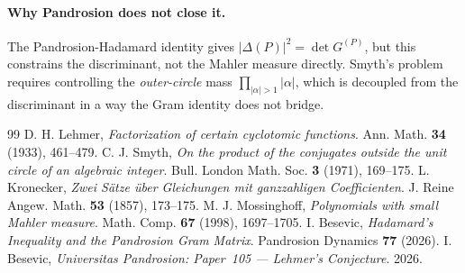 \documentclass[11pt,a4paper]{article}
\begin{document}
\paragraph{Why Pandrosion does not close it.}
The Pandrosion-Hadamard identity gives $|\Delta(P)|^2 = \det G^{(P)}$, but
this constrains the discriminant, not the Mahler measure directly. Smyth's
problem requires controlling the \emph{outer-circle} mass $\prod_{|\alpha|>1} |\alpha|$,
which is decoupled from the discriminant in a way the Gram identity does
not bridge.

\begin{thebibliography}{99}
 D. H. Lehmer, \textit{Factorization of certain cyclotomic
functions}. Ann. Math. \textbf{34} (1933), 461--479.
 C. J. Smyth, \textit{On the product of the conjugates
outside the unit circle of an algebraic integer}. Bull. London Math. Soc.
\textbf{3} (1971), 169--175.
 L. Kronecker, \textit{Zwei S\"atze \"uber Gleichungen
mit ganzzahligen Coefficienten}. J. Reine Angew. Math. \textbf{53}
(1857), 173--175.
 M. J. Mossinghoff, \textit{Polynomials with small
Mahler measure}. Math. Comp. \textbf{67} (1998), 1697--1705.
 I. Besevic, \textit{Hadamard's Inequality and the
Pandrosion Gram Matrix}. Pandrosion Dynamics \textbf{77} (2026).
 I. Besevic, \textit{Universitas Pandrosion: Paper~105 ---
Lehmer's Conjecture}. 2026.
\end{thebibliography}
\end{document}
